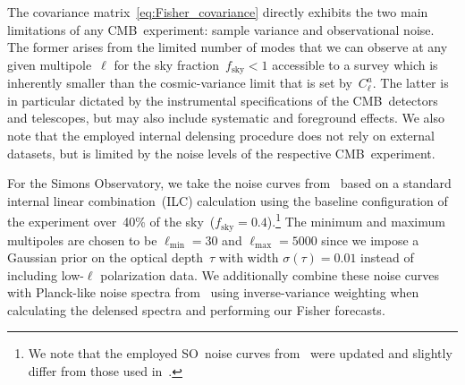 \documentclass[11pt]{article}
\numberwithin{equation}{section}
\begin{document}
The covariance matrix~\eqref{eq:Fisher_covariance} directly exhibits the two main limitations of any CMB~experiment: sample variance and observational noise. The former arises from the limited number of modes that we can observe at any given multipole~$\ell$ for the sky fraction~$f_\mathrm{sky} < 1$ accessible to a survey which is inherently smaller than the cosmic-variance limit that is set by~$C_\ell^a$. The latter is in particular dictated by the instrumental specifications of the CMB~detectors and telescopes, but may also include systematic and foreground effects. We also note that the employed internal delensing procedure does not rely on external datasets, but is limited by the noise levels of the respective CMB~experiment.

For the Simons Observatory, we take the noise curves from~\cite{SimonsObservatory:2018koc, SimonsObservatory:2020noise} based on a standard internal linear combination~(ILC) calculation using the baseline configuration of the experiment over~40\% of the sky~($f_\mathrm{sky} = 0.4$).\footnote{We note that the employed SO~noise curves from~\cite{SimonsObservatory:2020noise} were updated and slightly differ from those used in~\cite{SimonsObservatory:2018koc}.} The minimum and maximum multipoles are chosen to be $\ell_\mathrm{min} = 30$ and $\ell_\mathrm{max} = 5000$ since we impose a Gaussian prior on the optical depth~$\tau$ with width $\sigma(\tau) = 0.01$ instead of including low-$\ell$ polarization data. We additionally combine these noise curves with Planck-like noise spectra from~\cite{Allison:2015qca} using inverse-variance weighting when calculating the delensed spectra and performing our Fisher forecasts.
\end{document}
